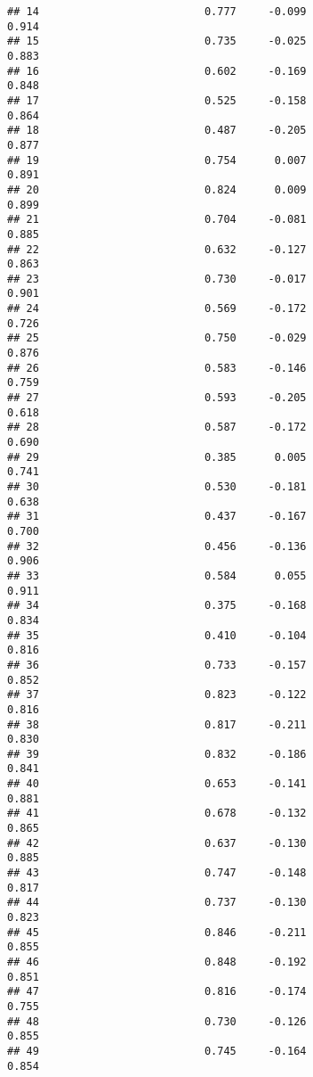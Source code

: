 \documentclass[
]{article}
\begin{document}
\begin{verbatim}
## 14                          0.777     -0.099                     0.914
## 15                          0.735     -0.025                     0.883
## 16                          0.602     -0.169                     0.848
## 17                          0.525     -0.158                     0.864
## 18                          0.487     -0.205                     0.877
## 19                          0.754      0.007                     0.891
## 20                          0.824      0.009                     0.899
## 21                          0.704     -0.081                     0.885
## 22                          0.632     -0.127                     0.863
## 23                          0.730     -0.017                     0.901
## 24                          0.569     -0.172                     0.726
## 25                          0.750     -0.029                     0.876
## 26                          0.583     -0.146                     0.759
## 27                          0.593     -0.205                     0.618
## 28                          0.587     -0.172                     0.690
## 29                          0.385      0.005                     0.741
## 30                          0.530     -0.181                     0.638
## 31                          0.437     -0.167                     0.700
## 32                          0.456     -0.136                     0.906
## 33                          0.584      0.055                     0.911
## 34                          0.375     -0.168                     0.834
## 35                          0.410     -0.104                     0.816
## 36                          0.733     -0.157                     0.852
## 37                          0.823     -0.122                     0.816
## 38                          0.817     -0.211                     0.830
## 39                          0.832     -0.186                     0.841
## 40                          0.653     -0.141                     0.881
## 41                          0.678     -0.132                     0.865
## 42                          0.637     -0.130                     0.885
## 43                          0.747     -0.148                     0.817
## 44                          0.737     -0.130                     0.823
## 45                          0.846     -0.211                     0.855
## 46                          0.848     -0.192                     0.851
## 47                          0.816     -0.174                     0.755
## 48                          0.730     -0.126                     0.855
## 49                          0.745     -0.164                     0.854

\end{verbatim}
\end{document}
